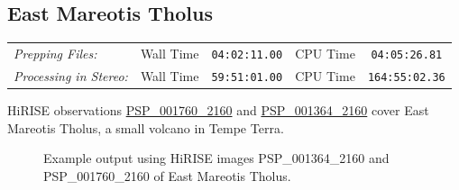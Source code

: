\clearpage
\subsection{East Mareotis Tholus}

\begin{tabular}{l r c r c}
\textit{Prepping Files:}       & Wall Time & \texttt{04:02:11.00} & CPU Time & \texttt{04:05:26.81} \\
\textit{Processing in Stereo:} & Wall Time & \texttt{59:51:01.00} & CPU Time & \texttt{164:55:02.36} \\
\end{tabular}

\ac{HiRISE} observations
\href{http://hirise.lpl.arizona.edu/PSP_001760_2160}{PSP\_001760\_2160} and
\href{http://hirise.lpl.arizona.edu/PSP_001364_2160}{PSP\_001364\_2160} 
cover East Mareotis Tholus, a small volcano in Tempe Terra.

\begin{figure}[h!]
\centering
  \hfil
\caption{Example output using HiRISE images PSP\_001364\_2160 and
  PSP\_001760\_2160 of East Mareotis Tholus.}
\label{fig:hirise_emare_example}
\end{figure}

